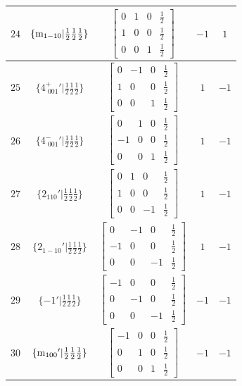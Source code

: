 \documentclass[fleqn,8pt]{jsarticle}
\begin{document}
\begin{longtable}{ccccc}
$ 24 $ & $ \{{\rm m}_{1-10}|\frac{1}{2} \frac{1}{2} \frac{1}{2}\} $ & $ \begin{bmatrix} 0 & 1 & 0 & \frac{1}{2} \\ 1 & 0 & 0 & \frac{1}{2} \\ 0 & 0 & 1 & \frac{1}{2} \end{bmatrix} $ & $ -1 $ & $ 1 $ \\ \hline
$ 25 $ & $ \{4^{+}_{\,\,001}{}'|\frac{1}{2} \frac{1}{2} \frac{1}{2}\} $ & $ \begin{bmatrix} 0 & -1 & 0 & \frac{1}{2} \\ 1 & 0 & 0 & \frac{1}{2} \\ 0 & 0 & 1 & \frac{1}{2} \end{bmatrix} $ & $ 1 $ & $ -1 $ \\ \hline
$ 26 $ & $ \{4^{-}_{\,\,001}{}'|\frac{1}{2} \frac{1}{2} \frac{1}{2}\} $ & $ \begin{bmatrix} 0 & 1 & 0 & \frac{1}{2} \\ -1 & 0 & 0 & \frac{1}{2} \\ 0 & 0 & 1 & \frac{1}{2} \end{bmatrix} $ & $ 1 $ & $ -1 $ \\ \hline
$ 27 $ & $ \{2{}_{110}{}'|\frac{1}{2} \frac{1}{2} \frac{1}{2}\} $ & $ \begin{bmatrix} 0 & 1 & 0 & \frac{1}{2} \\ 1 & 0 & 0 & \frac{1}{2} \\ 0 & 0 & -1 & \frac{1}{2} \end{bmatrix} $ & $ 1 $ & $ -1 $ \\ \hline
$ 28 $ & $ \{2{}_{1-10}{}'|\frac{1}{2} \frac{1}{2} \frac{1}{2}\} $ & $ \begin{bmatrix} 0 & -1 & 0 & \frac{1}{2} \\ -1 & 0 & 0 & \frac{1}{2} \\ 0 & 0 & -1 & \frac{1}{2} \end{bmatrix} $ & $ 1 $ & $ -1 $ \\ \hline
$ 29 $ & $ \{-1{}'|\frac{1}{2} \frac{1}{2} \frac{1}{2}\} $ & $ \begin{bmatrix} -1 & 0 & 0 & \frac{1}{2} \\ 0 & -1 & 0 & \frac{1}{2} \\ 0 & 0 & -1 & \frac{1}{2} \end{bmatrix} $ & $ -1 $ & $ -1 $ \\ \hline
$ 30 $ & $ \{{\rm m}_{100}{}'|\frac{1}{2} \frac{1}{2} \frac{1}{2}\} $ & $ \begin{bmatrix} -1 & 0 & 0 & \frac{1}{2} \\ 0 & 1 & 0 & \frac{1}{2} \\ 0 & 0 & 1 & \frac{1}{2} \end{bmatrix} $ & $ -1 $ & $ -1 $ \\ \hline

\end{longtable}
\end{document}

